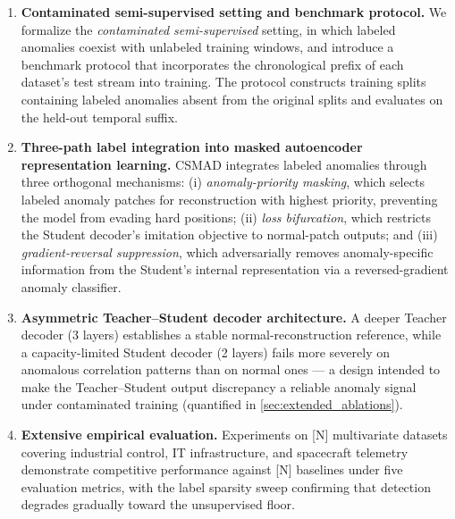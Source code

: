 \begin{enumerate}
  \item \textbf{Contaminated semi-supervised setting and benchmark protocol.}
    We formalize the \emph{contaminated semi-supervised} setting, in which labeled anomalies coexist with unlabeled training windows, and introduce a benchmark protocol that incorporates the chronological prefix of each dataset's test stream into training.
    The protocol constructs training splits containing labeled anomalies absent from the original splits and evaluates on the held-out temporal suffix.

  \item \textbf{Three-path label integration into masked autoencoder representation learning.}
    CSMAD integrates labeled anomalies through three orthogonal mechanisms:
    (i) \emph{anomaly-priority masking}, which selects labeled anomaly patches for reconstruction with highest priority, preventing the model from evading hard positions;
    (ii) \emph{loss bifurcation}, which restricts the Student decoder's imitation objective to normal-patch outputs;
    and (iii) \emph{gradient-reversal suppression}, which adversarially removes anomaly-specific information from the Student's internal representation via a reversed-gradient anomaly classifier.

  \item \textbf{Asymmetric Teacher--Student decoder architecture.}
    A deeper Teacher decoder (3 layers) establishes a stable normal-reconstruction reference, while a capacity-limited Student decoder (2 layers) fails more severely on anomalous correlation patterns than on normal ones --- a design intended to make the Teacher--Student output discrepancy a reliable anomaly signal under contaminated training (quantified in \ref{sec:extended_ablations}).

  \item \textbf{Extensive empirical evaluation.}
    Experiments on [N] multivariate datasets covering industrial control, IT infrastructure, and spacecraft telemetry demonstrate competitive performance against [N] baselines under five evaluation metrics, with the label sparsity sweep confirming that detection degrades gradually toward the unsupervised floor.
\end{enumerate}


\BodyFloatBarrier
